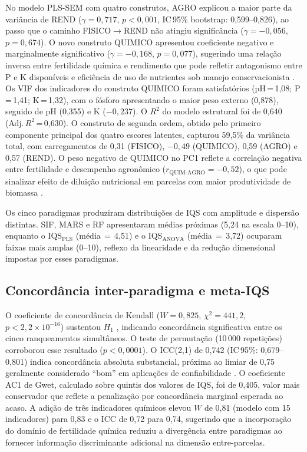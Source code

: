 \documentclass[pdflatex,sn-basic]{sn-jnl}%
\begin{document}
No modelo PLS-SEM com quatro construtos, AGRO explicou a maior parte da variância de REND ($\gamma = 0{,}717$, $p < 0{,}001$, IC\,95\% bootstrap: 0,599--0,826), ao passo que o caminho FISICO$\to$REND não atingiu significância ($\gamma = -0{,}056$, $p = 0{,}674$). O novo construto QUIMICO apresentou coeficiente negativo e marginalmente significativo ($\gamma = -0{,}168$, $p = 0{,}077$), sugerindo uma relação inversa entre fertilidade química e rendimento que pode refletir antagonismo entre P e K disponíveis e eficiência de uso de nutrientes sob manejo conservacionista \cite{Nabiollahi2018}. Os VIF dos indicadores do construto QUIMICO foram satisfatórios (pH\,=\,1,08; P\,=\,1,41; K\,=\,1,32), com o fósforo apresentando o maior peso externo (0,878), seguido de pH (0,355) e K ($-0{,}237$). O $R^2$ do modelo estrutural foi de 0,640 (Adj.\,$R^2$\,=\,0,630). O construto de segunda ordem, obtido pelo primeiro componente principal dos quatro escores latentes, capturou 59,5\% da variância total, com carregamentos de 0,31 (FISICO), $-0{,}49$ (QUIMICO), 0,59 (AGRO) e 0,57 (REND). O peso negativo de QUIMICO no PC1 reflete a correlação negativa entre fertilidade e desempenho agronômico ($r_{\text{QUIM-AGRO}} = -0{,}52$), o que pode sinalizar efeito de diluição nutricional em parcelas com maior produtividade de biomassa \cite{Berriel2023}.

Os cinco paradigmas produziram distribuições de IQS com amplitude e dispersão distintas. SIF, MARS e RF apresentaram médias próximas (5,24 na escala 0--10), enquanto o IQS$_{\text{PLS}}$ (média\,$=$\,4,51) e o IQS$_{\text{ANOVA}}$ (média\,$=$\,3,72) ocuparam faixas mais amplas (0--10), reflexo da linearidade e da redução dimensional impostas por esses paradigmas.

\subsection{Concordância inter-paradigma e meta-IQS}\label{subsec:concordance_disc}

O coeficiente de concordância de Kendall ($W = 0{,}825$, $\chi^2 = 441{,}2$, $p < 2{,}2 \times 10^{-16}$) sustentou $H_1$ \cite{Legendre2012}, indicando concordância significativa entre os cinco ranqueamentos simultâneos. O teste de permutação (10\,000 repetições) corroborou esse resultado ($p < 0{,}0001$). O ICC(2,1) de 0,742 (IC\,95\%: 0,679--0,801) indica concordância absoluta substancial, próxima ao limiar de 0,75 geralmente considerado ``bom'' em aplicações de confiabilidade \cite{Koo2016}. O coeficiente AC1 de Gwet, calculado sobre quintis dos valores de IQS, foi de 0,405, valor mais conservador que reflete a penalização por concordância marginal esperada ao acaso. A adição de três indicadores químicos elevou $W$ de 0,81 (modelo com 15 indicadores) para 0,83 e o ICC de 0,72 para 0,74, sugerindo que a incorporação do domínio de fertilidade química reduziu a divergência entre paradigmas ao fornecer informação discriminante adicional na dimensão entre-parcelas.
\end{document}
